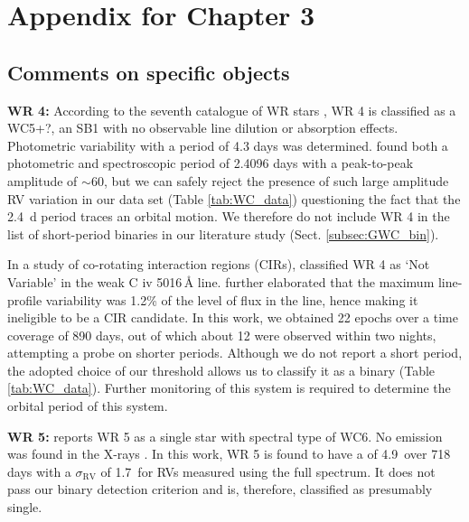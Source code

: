 \chapter{Appendix for Chapter 3}

\section{Comments on specific objects}\label{apdx:comments}

\textbf{WR 4:} According to the seventh catalogue of WR stars \citep{2001vanderHucht}, WR 4 is classified as a WC5+?, an SB1 with no observable line dilution or absorption effects. Photometric variability with a period of 4.3 days \citep{1986MoffatShara} was determined. \citet{1989RustamovCherepashchuk} found both a photometric and spectroscopic period of 2.4096 days with a peak-to-peak amplitude of ${\sim}$60\kms, but we can safely reject the presence of such large amplitude RV variation in our data set (Table \ref{tab:WC_data}) questioning the fact that the 2.4~d period traces  an orbital motion. We therefore do not include WR 4 in the list of short-period binaries in our literature study (Sect. \ref{subsec:GWC_bin}).

In a study of co-rotating interaction regions (CIRs), \citet{2009StLouis} classified WR 4 as `Not Variable' in the weak C {\sc iv} 5016\,\r{A} line. \citet{2011CheneStLouis} further elaborated that the maximum line-profile variability was 1.2\% of the level of flux in the line, hence making it ineligible to be a CIR candidate. In this work, we obtained 22 epochs over a time coverage of 890 days, out of which about 12 were observed within two nights, attempting a probe on shorter periods. Although we do not report a short period, the adopted choice of our threshold allows us to classify it as a binary (Table \ref{tab:WC_data}). Further monitoring of this system is required to determine the orbital period of this system.


\textbf{WR 5:} \citet{2001vanderHucht} reports WR 5 as a single star with spectral type of WC6. No emission was found in the X-rays \citep{Skinner2006,2009GudelNaze}. In this work, WR 5 is found to have a \DelRV{} of 4.9\,\kms{} over 718 days with a $\sigma_\textrm{RV}$ of 1.7\,\kms{} for RVs measured using the full spectrum. It does not pass our binary detection criterion and is, therefore, classified as presumably single.

